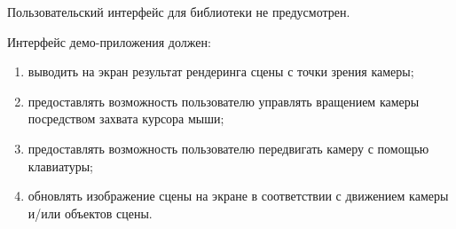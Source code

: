 Пользовательский интерфейс для библиотеки не предусмотрен. 

Интерфейс демо-приложения должен:
\begin{enumerate}
    \item выводить на экран результат рендеринга сцены с точки зрения камеры;
    \item предоставлять возможность пользователю управлять вращением камеры посредством захвата курсора мыши;
    \item предоставлять возможность пользователю передвигать камеру с помощью клавиатуры;
    \item обновлять изображение сцены на экране в соответствии с движением камеры и/или объектов сцены.
\end{enumerate}
